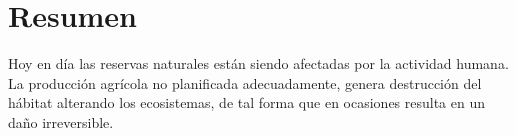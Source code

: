
%
%
%
%
%

\section*{Resumen}
Hoy en día las reservas naturales están siendo afectadas por la actividad humana. La producción agrícola no planificada adecuadamente, genera destrucción del hábitat alterando los ecosistemas, de tal forma que en ocasiones resulta en un daño irreversible.    \\

